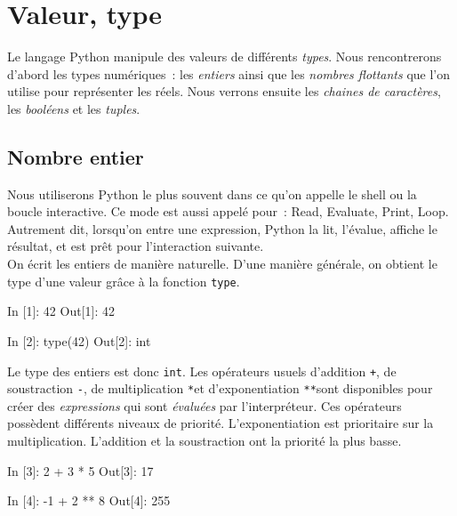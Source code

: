 \documentclass{magnolia}
\begin{document}

\magtoc

\section{Valeur, type}

Le langage Python manipule des valeurs de différents \emph{types}.
Nous rencontrerons d'abord les types numériques~: les \emph{entiers} ainsi que les
\emph{nombres flottants} que l'on utilise pour représenter les réels. Nous verrons
ensuite les \emph{chaines de caractères}, les \emph{booléens} et les \emph{tuples}.

\subsection{Nombre entier}

Nous utiliserons Python le plus souvent dans ce qu'on
appelle le shell ou la boucle interactive. Ce mode est aussi appelé
 \fg pour~: Read, Evaluate, Print, Loop. Autrement dit, lorsqu'on entre
une expression, Python la lit, l'évalue, affiche le résultat, et est
prêt pour l'interaction suivante.\\

On écrit les entiers de manière naturelle. D'une manière générale,
on obtient le type d'une valeur grâce à la fonction \verb_type_. 

\begin{pythoncode}
In [1]: 42
Out[1]: 42

In [2]: type(42)
Out[2]: int
\end{pythoncode}

\noindent Le type des entiers est donc \verb_int_. 
Les opérateurs usuels d'addition \og\verb_+_\fg, de soustraction \og\verb_-_\fg, de
multiplication \og\verb+*+\fg et d'exponentiation \og\verb_**_\fg sont disponibles pour
créer des \emph{expressions} qui sont \emph{évaluées} par l'interpréteur. Ces opérateurs
possèdent différents niveaux de priorité. L'exponentiation est prioritaire sur 
la multiplication. L'addition et la soustraction ont la priorité la plus basse.

\begin{pythoncode}
In [3]: 2 + 3 * 5
Out[3]: 17

In [4]: -1 + 2 ** 8
Out[4]: 255
\end{pythoncode}
\end{document}
